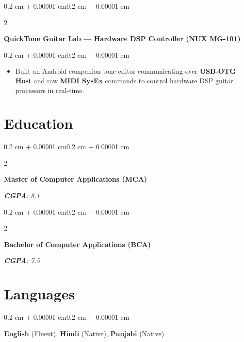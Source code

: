 \documentclass[10pt, a4paper]{article}
\newenvironment{highlights}{
    \begin{itemize}[
        topsep=0.06 cm,
        parsep=0.05 cm,
        partopsep=0pt,
        itemsep=0pt,
        leftmargin=0.4 cm + 10pt
    ]
}{
    \end{itemize}
}
\newenvironment{onecolentry}{
    \begin{adjustwidth}{0.2 cm + 0.00001 cm}{0.2 cm + 0.00001 cm}
}{
    \end{adjustwidth}
}
\newenvironment{twocolentry}[2][]{
    \onecolentry
    \def\secondColumn{#2}
    \setcolumnwidth{\fill, 4.5 cm}
    \begin{paracol}{2}
}{
    \switchcolumn \raggedleft \secondColumn
    \end{paracol}
    \endonecolentry
}
\let\hrefWithoutArrow\href
\renewcommand{\href}[2]{\hrefWithoutArrow{#1}{\ifthenelse{\equal{#2}{}}{ }{#2 }\raisebox{.15ex}{\footnotesize \faExternalLink*}}}
\begin{document}
\begin{twocolentry}{\textit{\href{https://github.com/I-am-Manu-Singh/nux-mg-101-quick-tone}{\underline{Repo}}}}
    \textbf{QuickTone Guitar Lab — Hardware DSP Controller (NUX MG-101)}
\end{twocolentry}
\vspace{0.06 cm}
\begin{onecolentry}
    \begin{highlights}
    \item Built an Android companion tone editor communicating over \textbf{USB-OTG Host} and raw \textbf{MIDI SysEx} commands to control hardware DSP guitar processors in real-time.
    \end{highlights}
\end{onecolentry}

\section{Education}
\begin{twocolentry}{\textit{\textbf{CGPA}: 8.1}}
    \textbf{Master of Computer Applications (MCA)} 
\end{twocolentry}
\vspace{0.04 cm}
\begin{twocolentry}{\textit{\textbf{CGPA}: 7.5}}
    \textbf{Bachelor of Computer Applications (BCA)} 
\end{twocolentry}

\section{Languages}
\begin{onecolentry}
\textbf{English} (Fluent), \textbf{Hindi} (Native), \textbf{Punjabi} (Native)
\end{onecolentry}
\end{document}
